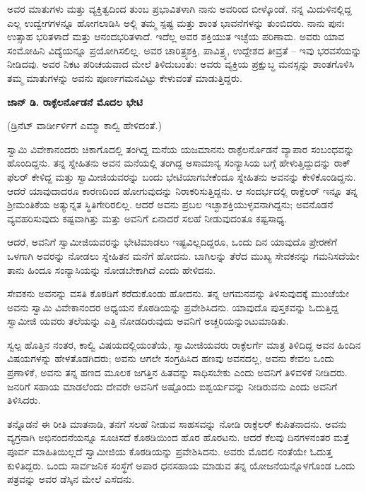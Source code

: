 ಅವರ ಮಾತುಗಳು ಮತ್ತು ವ್ಯಕ್ತಿತ್ವದಿಂದ ತುಂಬ ಪ್ರಭಾವಿತಳಾಗಿ ನಾನು ಅವರಿಂದ ಬೀಳ್ಕೊಂಡೆ. ನನ್ನ ಮಿದುಳಿನಲ್ಲಿದ್ದ ಎಲ್ಲ ಉದ್ವೇಗಗಳನ್ನೂ ಹೋಗಲಾಡಿಸಿ ಅಲ್ಲಿ ತಮ್ಮ ಸ್ಪಷ್ಟ ಮತ್ತು ಶಾಂತ ಭಾವನೆಗಳನ್ನು ತುಂಬಿದರು. ನಾನು ಪುನಃ ಉತ್ಸಾಹ ಭರಿತಳಾದೆ ಮತ್ತು ಆನಂದಭರಿತಳಾದೆ. ಇದೆಲ್ಲ ಅವರ ಶಕ್ತಿಯುತ ಇಚ್ಛೆಯ ಪರಿಣಾಮ. ಅವರು ಯಾವ ಸಂಮೋಹಿನಿ ವಿದ್ಯೆಯನ್ನೂ ಪ್ರಯೋಗಿಸಲಿಲ್ಲ. ಅವರ ಚಾರಿತ್ರ್ಯಶಕ್ತಿ, ಪಾವಿತ್ರ್ಯ, ಉದ್ದೇಶದ ತೀವ್ರತೆ – ಇವು ಭರವಸೆಯನ್ನು ನೀಡಿದವು. ಅವರ ನಿಕಟ ಪರಿಚಯವಾದ ಮೇಲೆ ತಿಳಿದುಬಂತು: ಅವರು ವ್ಯಕ್ತಿಯ ಪ್ರಕ್ಷುಬ್ಧ ಮನಸ್ಸನ್ನು ಶಾಂತಗೊಳಿಸಿ ತಮ್ಮ ಮಾತುಗಳನ್ನು ಅವನು ಪೂರ್ಣಗಮನವಿಟ್ಟು ಕೇಳುವಂತೆ ಮಾಡುತ್ತಿದ್ದರು.

\begin{center}
\textbf{ಜಾನ್ ಡಿ. ರಾಕ್ಫೆಲರ್ನೊಡನೆ ಮೊದಲ ಭೇಟಿ}
\end{center}

\begin{center}
(ಡ್ರಿನೆಟ್ ವಾರ್ಡೀರ್ಳಿಗೆ ಎಮ್ಮಾ ಕಾಲ್ವಿ ಹೇಳಿದಂತೆ.)
\end{center}

ಸ್ವಾಮಿ ವಿವೇಕಾನಂದರು ಚಿಕಾಗೊದಲ್ಲಿ ತಂಗಿದ್ದ ಮನೆಯ ಯಜಮಾನನು ರಾಕ್ಫೆಲರ್ನೊಡನೆ ವ್ಯಾಪಾರ ಸಂಬಂಧವನ್ನು ಹೊಂದಿದ್ದನು. ತನ್ನ ಸ್ನೇಹಿತನು ಅವನ ಮನೆಯಲ್ಲಿ ತಂಗಿದ್ದ ಅಸಾಮಾನ್ಯ ಸಂನ್ಯಾಸಿಯ ಬಗ್ಗೆ ಹೇಳುತ್ತಿದ್ದುದನ್ನು ರಾಕ್ ಫೆಲರ್ ಕೇಳಿದ್ದ ಮತ್ತು ಸ್ವಾಮೀಜಿಯವರನ್ನು ಬಂದು ಭೇಟಿಯಾಗಬೇಕೆಂದೂ ಸ್ನೇಹಿತನು ಅವನನ್ನು ಕೇಳಿಕೊಂಡಿದ್ದನು. ಆದರೆ ಯಾವುದಾದರೂ ಕಾರಣದಿಂದ ಹೋಗುವುದನ್ನು ನಿರಾಕರಿಸುತ್ತಿದ್ದನು. ಆ ಸಂದರ್ಭದಲ್ಲಿ ರಾಕ್ಫೆಲರ್ ಇನ್ನೂ ತನ್ನ ಶ‍್ರೀಮಂತಿಕೆಯ ಅತ್ಯುನ್ನತ ಸ್ಥಿತಿಗೇರಿರಲಿಲ್ಲ. ಆದರೆ ಅವನು ಪ್ರಬಲ ಇಚ್ಛಾಶಕ್ತಿಯುಳ್ಳವನಾಗಿದ್ದನು; ಅವನೊಡನೆ ವ್ಯವಹರಿಸುವುದು ಕಷ್ಟವಾಗಿತ್ತು ಮತ್ತು ಅವನಿಗೆ ಏನಾದರೆ ಸಲಹೆ ನೀಡುವುದಂತೂ ಕಷ್ಟಸಾಧ್ಯ.

ಆದರೆ, ಅವನಿಗೆ ಸ್ವಾಮೀಜಿಯವರನ್ನು ಭೇಟಿಮಾಡಲು ಇಷ್ಟವಿಲ್ಲದಿದ್ದರೂ, ಒಂದು ದಿನ ಯಾವುದೊ ಪ್ರೇರಣೆಗೆ ಒಳಗಾಗಿ ಅವರನ್ನು ನೋಡಲು ಸ್ನೇಹಿತನ ಮನೆಗೆ ಹೋದನು. ಬಾಗಿಲನ್ನು ತೆರೆದ ಮುಖ್ಯ ಸೇವಕನನ್ನು ಗಮನಿಸದೆಯೇ ತಾನು ಹಿಂದೂ ಸಂನ್ಯಾಸಿಯನ್ನು ನೋಡಬೇಕಾಗಿದೆ ಎಂದು ಹೇಳಿದನು.

ಸೇವಕನು ಅವನನ್ನು ವಸತಿ ಕೊಠಡಿಗೆ ಕರೆದುಕೊಂಡು ಹೋದನು. ತನ್ನ ಆಗಮನವನ್ನು ತಿಳಿಸುವುದಕ್ಕೆ ಮುಂಚೆಯೇ ಅವನು ಸ್ವಾಮಿ ವಿವೇಕಾನಂದರ ಅಧ್ಯಯನ ಕೊಠಡಿಯನ್ನು ಪ್ರವೇಶಿಸಿದನು. ಯಾವುದೊ ಪುಸ್ತಕವನ್ನು ಓದುತ್ತಿದ್ದ ಸ್ವಾಮೀಜಿ ಯವರು ತಲೆಯನ್ನು ಎತ್ತಿ ನೋಡದಿರುವುದು ಅವನಿಗೆ ಅಚ್ಚರಿಯನ್ನುಂಟುಮಾಡಿತು.

ಸ್ವಲ್ಪ ಹೊತ್ತಿನ ನಂತರ, ಕಾಲ್ವಿ ವಿಷಯದಲ್ಲಿಯಂತೆಯೆ, ಸ್ವಾಮೀಜಿಯವರು ರಾಕ್ಫೆಲರ್ಗೆ ಮಾತ್ರ ತಿಳಿದಿದ್ದ ಅವನ ಹಿಂದಿನ ವಿಷಯಗಳನ್ನು ಹೇಳತೊಡಗಿದರು; ಅವನು ಆಗಲೇ ಸಂಗ್ರಹಿಸಿದ ಹಣವು ಅವನದಲ್ಲ, ಅವನು ಕೇವಲ ಒಂದು ಪ್ರಣಾಳಿಕೆ, ಅವನು ತನ್ನ ಹಣದ ಮೂಲಕ ಜಗತ್ತಿನ ಹಿತವನ್ನು ಸಾಧಿಸಬೇಕು ಎಂದು ಅವನಿಗೆ ತಿಳಿವಳಿಕೆ ನೀಡಿದರು. ಜನರಿಗೆ ಸಹಾಯ ಮಾಡಲೆಂದು ದೇವರೇ ಅವನಿಗೆ ಅಷ್ಟೊಂದು ಐಶ್ವರ್ಯವನ್ನು ನೀಡಿರುವನು ಎಂದು ಅವನಿಗೆ ತಿಳಿಸಿದರು.

ತನ್ನೊಡನೆ ಈ ರೀತಿ ಮಾತನಾಡಿ, ತನಗೆ ಸಲಹೆ ನೀಡುವ ಸಾಹಸವನ್ನು ನೋಡಿ ರಾಕ್ಫೆಲರ್ ಕುಪಿತನಾದನು. ಅವನು ವ್ಯಗ್ರನಾಗಿ ಅಭಿನಂದನೆಯನ್ನೂ ಸೂಚಿಸದೆ ಕೊಠಡಿಯಿಂದ ಹೊರ ಹೊರಟನು. ಆದರೆ ಕೆಲವು ದಿನಗಳನಂತರ ಮತ್ತೆ ಪೂರ್ವ ಮಾಹಿತಿಯಿಲ್ಲದೆ ಸ್ವಾಮೀಜಿಯ ಕೊಠಡಿಯನ್ನು ಪ್ರವೇಶಿಸಿದನು. ಅವರು ಮೊದಲಿ ನಂತೆಯೇ ಓದುತ್ತ ಕುಳಿತಿದ್ದರು. ಒಂದು ಸಾರ್ವಜನಿಕ ಸಂಸ್ಥೆಗೆ ಅಪಾರ ಧನಸಹಾಯ ಮಾಡುವ ತನ್ನ ಯೋಜನೆಯನ್ನೊಳಗೊಂಡ ಒಂದು ಪತ್ರವನ್ನು ಅವರ ಡೆಸ್ಕಿನ ಮೇಲೆ ಎಸೆದನು.


